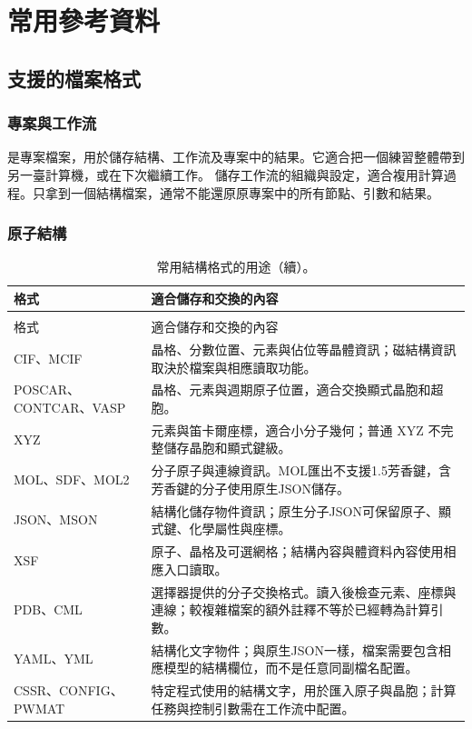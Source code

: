 \chapter{常用參考資料}\label{ch:reference}


\section{支援的檔案格式}

\subsection{專案與工作流}

 是專案檔案，用於儲存結構、工作流及專案中的結果。它適合把一個練習整體帶到另一臺計算機，或在下次繼續工作。 儲存工作流的組織與設定，適合複用計算過程。只拿到一個結構檔案，通常不能還原原專案中的所有節點、引數和結果。

\Needspace{38mm}
\subsection{原子結構}

\begin{longtable}{>{\raggedright\arraybackslash}p{.34\linewidth}>{\raggedright\arraybackslash}p{}}
\caption{常用結構格式的用途。}\\
\toprule
格式 & 適合儲存和交換的內容 \\
\midrule
\endfirsthead
\caption[]{常用結構格式的用途（續）。}\\
\toprule
格式 & 適合儲存和交換的內容 \\
\midrule
\endhead
\bottomrule
\endfoot
\bottomrule
\endlastfoot
CIF、MCIF & 晶格、分數位置、元素與佔位等晶體資訊；磁結構資訊取決於檔案與相應讀取功能。\\
POSCAR、CONTCAR、VASP & 晶格、元素與週期原子位置，適合交換顯式晶胞和超胞。\\
XYZ & 元素與笛卡爾座標，適合小分子幾何；普通 XYZ 不完整儲存晶胞和顯式鍵級。\\
MOL、SDF、MOL2 & 分子原子與連線資訊。MOL匯出不支援1.5芳香鍵，含芳香鍵的分子使用原生JSON儲存。\\
JSON、MSON & 結構化儲存物件資訊；原生分子JSON可保留原子、顯式鍵、化學屬性與座標。\\
XSF & 原子、晶格及可選網格；結構內容與體資料內容使用相應入口讀取。\\
PDB、CML & 選擇器提供的分子交換格式。讀入後檢查元素、座標與連線；較複雜檔案的額外註釋不等於已經轉為計算引數。\\
YAML、YML & 結構化文字物件；與原生JSON一樣，檔案需要包含相應模型的結構欄位，而不是任意同副檔名配置。\\
CSSR、CONFIG、PWMAT & 特定程式使用的結構文字，用於匯入原子與晶胞；計算任務與控制引數需在工作流中配置。\\
\end{longtable}

